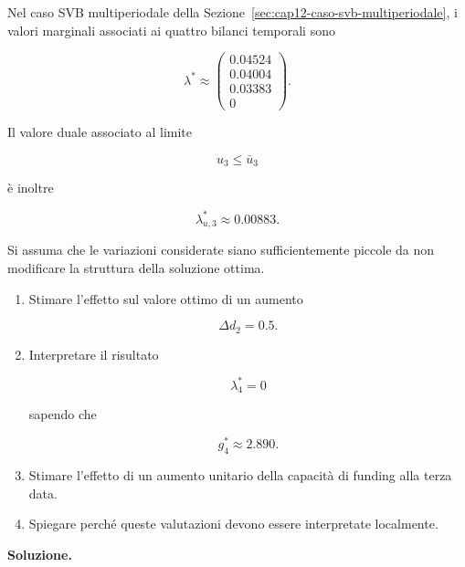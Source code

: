\begin{exercise}

\label{ex:cap12-valori-duali}

Nel caso SVB multiperiodale della
Sezione~\ref{sec:cap12-caso-svb-multiperiodale}, i valori marginali associati
ai quattro bilanci temporali sono

\[
\lambda^*
\approx
\begin{pmatrix}
0.04524\\
0.04004\\
0.03383\\
0
\end{pmatrix}.
\]

Il valore duale associato al limite

\[
u_3\leq\bar u_3
\]

\`e inoltre

\[
\lambda_{u,3}^*
\approx
0.00883.
\]

Si assuma che le variazioni considerate siano sufficientemente piccole da
non modificare la struttura della soluzione ottima.

\begin{enumerate}

\item Stimare l'effetto sul valore ottimo di un aumento

\[
\Delta d_2=0.5.
\]

\item Interpretare il risultato

\[
\lambda_4^*=0
\]

sapendo che

\[
g_4^*\approx2.890.
\]

\item Stimare l'effetto di un aumento unitario della capacit\`a di funding
alla terza data.

\item Spiegare perch\'e queste valutazioni devono essere interpretate
localmente.

\end{enumerate}

\end{exercise}

\noindent
\textbf{Soluzione.}

